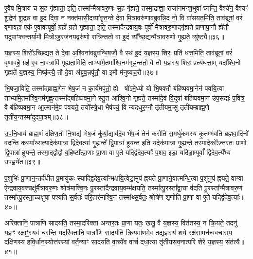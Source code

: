 ए॒वैष मि॒त्राय॑ च स॒ह गृ॑ह्याता॒ इति॒ तस्मा᳚न्मैत्रावरु॒णः स॒ह गृ॑ह्यते॒ तस्मा॒द्राज्ञा॒ राजा॑नमꣳश॒भुवा᳚ घ्नन्ति॒ वैश्ये॑न॒ वैश्यꣳ॑ शू॒द्रेण॑ शू॒द्रन्न वा इ॒दं दिवा॒ न नक्त॑मासी॒दव्या॑वृत्त॒न्ते दे॒वा मि॒त्रावरु॑णावब्रुवन्नि॒दं नो॒ वि वा॑सयत॒मिति॒ ताव॑ब्रूतां॒ वरं॑ वृणावहा॒ एक॑ ए॒वावत्पूर्वो॒ ग्रहो॑ ग्रहो गृह्याता॒ इति॒ तस्मा॑दैन्द्रवाय॒वः पूर्वो॑ मैत्रावरु॒णाद्गृ॑ह्यते प्राणापा॒नौ ह्ये॑तौ यदु॑पाꣳश्वन्तर्या॒मौ मि॒त्रो\-ऽह॒रज॑नय॒द्वरु॑णो॒ रात्रि॒न्ततो॒ वा इ॒दं व्यौ᳚च्छ॒द्यन्मै᳚त्रावरु॒णो गृ॒ह्यते॒ व्यु॑ष्ट्यै॥३६॥

{\anuvakamend[{ए॒ष चै᳚न्द्रवाय॒वो द्वाविꣳ॑शतिश्च॥८॥}]}

य॒ज्ञस्य॒ शिरो᳚\-ऽच्छिद्यत॒ ते दे॒वा अ॒श्विना॑वब्रुवन्भि॒षजौ॒ वै स्थ॑ इ॒दं य॒ज्ञस्य॒ शिरः॒ प्रति॑ धत्त॒मिति॒ ताव॑ब्रूतां॒ वरं॑ वृणावहै॒ ग्रह॑ ए॒व ना॒वत्रापि॑ गृह्यता॒मिति॒ ताभ्या॑मे॒तमा᳚श्वि॒नम॑गृह्ण॒न्ततो॒ वै तौ य॒ज्ञस्य॒ शिरः॒ प्रत्य॑धत्ता॒म् यदा᳚श्वि॒नो गृ॒ह्यते॑ य॒ज्ञस्य॒ निष्कृ॑त्यै॒ तौ दे॒वा अ॑ब्रुव॒न्नपू॑तौ॒ वा इ॒मौ म॑नुष्यच॒रौ॥३७॥

भि॒षजा॒विति॒ तस्मा᳚द्ब्राह्म॒णेन॑ भेष॒जं न का॒र्य॑मपू॑तो॒ ह्ये  षो॑\-ऽमे॒ध्यो यो भि॒षक्तौ ब॑हिष्पवमा॒नेन॑ पवयि॒त्वा ताभ्या॑मे॒तमा᳚श्वि॒नम॑गृह्ण॒न्तस्मा᳚द्बहिष्पवमा॒ने स्तु॒त आ᳚श्वि॒नो गृ॑ह्यते॒ तस्मा॑दे॒वं वि॒दुषा॑ बहिष्पवमा॒न उ॑प॒सद्यः॑ प॒वित्रं॒ वै ब॑हिष्पवमा॒न आ॒त्मान॑मे॒व प॑वयते॒ तयो᳚स्त्रे॒धा भैष॑ज्यं॒ वि न्य॑दधुर॒ग्नौ तृ॑तीयम॒प्सु तृती॑यम्ब्राह्म॒णे तृती॑य॒न्तस्मा॑दुदपा॒त्रम्॥३८॥

उ॒प॒नि॒धाय॑ ब्राह्म॒णं द॑क्षिण॒तो नि॒षाद्य॑ भेष॒जं कु॑र्या॒द्याव॑दे॒व भे॑ष॒जं तेन॑ करोति स॒मर्धु॑कमस्य कृ॒तम्भ॑वति ब्रह्मवा॒दिनो॑ वदन्ति॒ कस्मा᳚थ्स॒त्यादेक॑पात्रा द्विदेव॒त्या॑ गृ॒ह्यन्ते᳚ द्वि॒पात्रा॑ हूयन्त॒ इति॒ यदेक॑पात्रा गृ॒ह्यन्ते॒ तस्मा॒देको᳚\-ऽन्तर॒तः प्रा॒णो द्वि॒पात्रा॑ हूयन्ते॒ तस्मा॒द्द्वौद्वौ॑ ब॒हिष्टा᳚त्प्रा॒णाः प्रा॒णा वा ए॒ते यद्द्वि॑देव॒त्याः᳚ प॒शव॒ इडा॒ यदिडा॒म्पूर्वां᳚ द्विदेव॒त्ये᳚भ्य उप॒ह्वये॑त॥३९॥

प॒शुभिः॑ प्रा॒णान॒न्तर्द॑धीत प्र॒मायु॑कः स्याद्द्विदेव॒त्या᳚न्भक्षयि॒त्वेडा॒मुप॑ ह्वयते प्रा॒णाने॒वात्मन्धि॒त्वा प॒शूनुप॑ ह्वयते॒ वाग्वा ऐ᳚न्द्रवाय॒वश्चक्षु॑र्मैत्रावरु॒णः श्रोत्र॑माश्वि॒नः पु॒रस्ता॑दैन्द्रवाय॒वम्भ॑क्षयति॒ तस्मा᳚त्पु॒रस्ता᳚द्वा॒चा व॑दति पु॒रस्ता᳚न्मैत्रावरु॒णं तस्मा᳚त्पु॒रस्ता॒च्चक्षु॑षा पश्यति स॒र्वतः॑ परि॒हार॑माश्वि॒नं तस्मा᳚थ्स॒र्वतः॒ श्रोत्रे॑ण शृणोति प्रा॒णा वा ए॒ते यद्द्वि॑देव॒त्याः᳚॥४०॥

अरि॑क्तानि॒ पात्रा॑णि सादयति॒ तस्मा॒दरि॑क्ता अन्तर॒तः प्रा॒णा यतः॒ खलु॒ वै य॒ज्ञस्य॒ वित॑तस्य॒ न क्रि॒यते॒ तदनु॑ य॒ज्ञꣳ रक्षा॒ꣳ॒स्यव॑ चरन्ति॒ यदरि॑क्तानि॒ पात्रा॑णि सा॒दय॑ति क्रि॒यमा॑णमे॒व तद्य॒ज्ञस्य॑ शये॒ रक्ष॑सा॒मन॑न्ववचाराय॒ दक्षि॑णस्य हवि॒र्धान॒स्योत्त॑रस्यां वर्त॒न्याꣳ सा॑दयति वा॒च्ये॑व वाचं॑ दधा॒त्या तृ॑तीयसव॒नात्परि॑ शेरे य॒ज्ञस्य॒ संत॑त्यै॥४१॥


